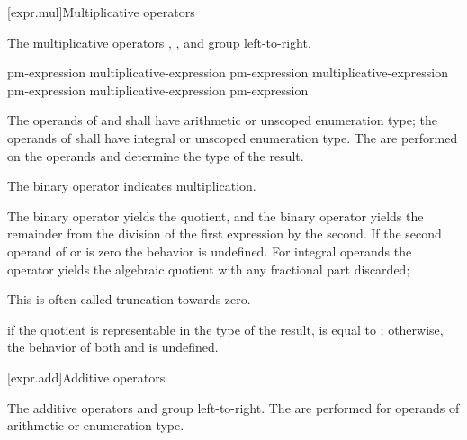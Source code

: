[expr.mul]{Multiplicative operators}%
%

\pnum
The multiplicative operators \tcode{*}, \tcode{/}, and \tcode{\%} group
left-to-right.

%
%
%
%
%
%
%
%
\begin{bnf}
\br
    pm-expression\br
    multiplicative-expression \terminal{*} pm-expression\br
    multiplicative-expression \terminal{/} pm-expression\br
    multiplicative-expression \terminal{\%} pm-expression
\end{bnf}

\pnum
The operands of \tcode{*} and \tcode{/} shall have arithmetic or unscoped
enumeration type; the operands of \tcode{\%} shall have integral or unscoped
enumeration type. The  are performed on the
operands and determine the type of the result.

\pnum
The binary \tcode{*} operator indicates multiplication.

\pnum
The binary \tcode{/} operator yields the quotient, and the binary
\tcode{\%} operator yields the remainder from the division of the first
expression by the second.
%
If the second operand of \tcode{/} or \tcode{\%} is zero the behavior is
undefined.
For integral operands the \tcode{/} operator yields the algebraic quotient with
any fractional part discarded;
\begin{footnote}
This is often called truncation towards zero.
\end{footnote}
if the quotient  is representable in the type of the result,
 is equal to ; otherwise, the behavior
of both  and  is undefined.

[expr.add]{Additive operators}%
%

\pnum
The additive operators \tcode{+} and \tcode{-} group left-to-right. The
 are performed for operands of arithmetic or
enumeration type.

